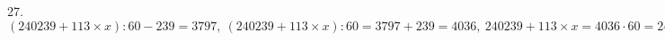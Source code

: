 27. $(240239+113\times x):60-239=3797,\ (240239+113\times x):60=3797+239=4036,\ 240239+113\times x=4036\cdot60=242160,\ 113\times x=242160-240239=1921,\ x=1921:113=17.$\\
